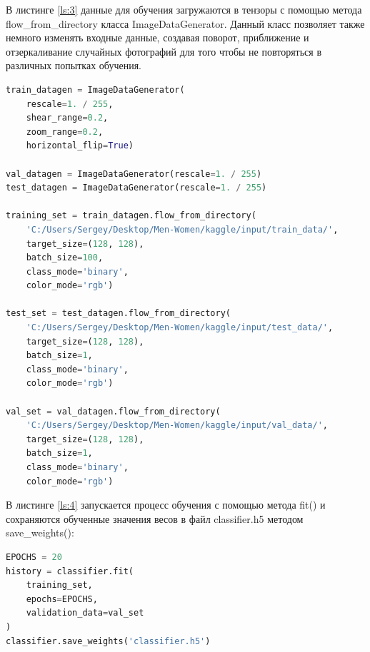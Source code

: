 В листинге \ref{ls:3} данные для обучения загружаются в тензоры с помощью метода flow\_from\_directory класса ImageDataGenerator. Данный класс позволяет также немного изменять входные данные, создавая поворот, приближение и отзеркаливание случайных фотографий для того чтобы не повторяться в различных попытках обучения.
\begin{lstlisting}[caption={Использовние класса ImageDataGenerator и метода flow\_from\_directory},language=python,label={ls:3}]
train_datagen = ImageDataGenerator(
    rescale=1. / 255,
    shear_range=0.2,
    zoom_range=0.2,
    horizontal_flip=True)

val_datagen = ImageDataGenerator(rescale=1. / 255)
test_datagen = ImageDataGenerator(rescale=1. / 255)

training_set = train_datagen.flow_from_directory(
    'C:/Users/Sergey/Desktop/Men-Women/kaggle/input/train_data/',
    target_size=(128, 128),
    batch_size=100,
    class_mode='binary',
    color_mode='rgb')

test_set = test_datagen.flow_from_directory(
    'C:/Users/Sergey/Desktop/Men-Women/kaggle/input/test_data/',
    target_size=(128, 128),
    batch_size=1,
    class_mode='binary',
    color_mode='rgb')

val_set = val_datagen.flow_from_directory(
    'C:/Users/Sergey/Desktop/Men-Women/kaggle/input/val_data/',
    target_size=(128, 128),
    batch_size=1,
    class_mode='binary',
    color_mode='rgb')
\end{lstlisting}

В листинге \ref{ls:4} запускается процесс обучения с помощью метода fit() и сохраняются обученные значения весов в файл classifier.h5 методом save\_weights():
\begin{lstlisting}[caption={Использовние метода fit() и save\_weights()},language=python,label={ls:4}] 
EPOCHS = 20
history = classifier.fit(
    training_set,
    epochs=EPOCHS,
    validation_data=val_set
)
classifier.save_weights('classifier.h5')
\end{lstlisting}

